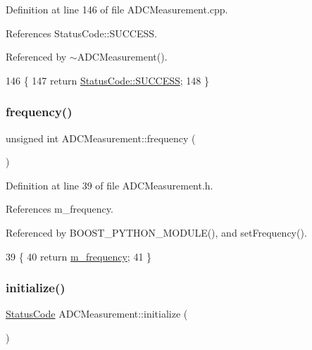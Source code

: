 Definition at line 146 of file A\+D\+C\+Measurement.\+cpp.



References Status\+Code\+::\+S\+U\+C\+C\+E\+SS.



Referenced by $\sim$\+A\+D\+C\+Measurement().


\begin{DoxyCode}
146                                       \{
147   \textcolor{keywordflow}{return} \hyperlink{classStatusCode_a6f565cbeadc76d14c72f047e5e85eb4badd0da38d3ba0d922efd1f4619bc37ad8}{StatusCode::SUCCESS};
148 \}
\end{DoxyCode}
\mbox{\label{classADCMeasurement_ad3d523331ad64494f2415319a03c638e}} 
\subsubsection{\texorpdfstring{frequency()}{frequency()}}
{\footnotesize\ttfamily unsigned int A\+D\+C\+Measurement\+::frequency (\begin{DoxyParamCaption}{ }\end{DoxyParamCaption})\hspace{0.3cm}{\ttfamily [inline]}}



Definition at line 39 of file A\+D\+C\+Measurement.\+h.



References m\+\_\+frequency.



Referenced by B\+O\+O\+S\+T\+\_\+\+P\+Y\+T\+H\+O\+N\+\_\+\+M\+O\+D\+U\+L\+E(), and set\+Frequency().


\begin{DoxyCode}
39                           \{
40     \textcolor{keywordflow}{return} \hyperlink{classADCMeasurement_ab4a0653cc015ddf9b33b877c1d43b260}{m\_frequency};
41   \}
\end{DoxyCode}
\mbox{\label{classADCMeasurement_a3fc6d3e863fecc7a1caf91f9b0ca5268}} 
\subsubsection{\texorpdfstring{initialize()}{initialize()}}
{\footnotesize\ttfamily \hyperlink{classStatusCode}{Status\+Code} A\+D\+C\+Measurement\+::initialize (\begin{DoxyParamCaption}{ }\end{DoxyParamCaption})\hspace{0.3cm}{\ttfamily [virtual]}}



